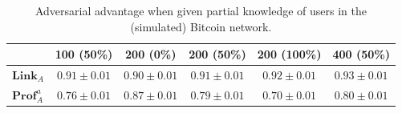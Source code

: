 \begin{table}
\begin{center}
\caption{Adversarial advantage when given partial knowledge of users in the (simulated) Bitcoin network.}
\label{tab:eval-privacy-results}
    \begin{tabular}{|l||ccccc|}\hline
    ~                   & 100 (50\%) & 200 (0\%) & 200 (50\%) & 200 (100\%) & 400 (50\%) \\ \hline
    $\mathbf{Link}_A$   & $0.91 \pm 0.01$ & $0.90 \pm 0.01$ & $0.91 \pm 0.01$ & $0.92 \pm 0.01$ & $0.93 \pm 0.01$ \\
    $\mathbf{Prof}_A^a$ & $0.76 \pm 0.01$ & $0.87 \pm 0.01$ & $0.79 \pm 0.01$ & $0.70 \pm 0.01$ & $0.80 \pm 0.01$ \\ \hline
    \end{tabular}
\end{center}
\end{table}


